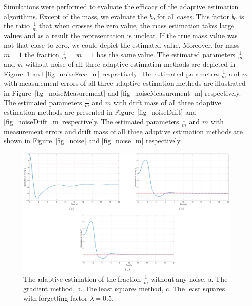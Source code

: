 \documentclass[12pt]{article}
\newenvironment{question}[2][Question]{\begin{trivlist}
\item[\hskip \labelsep {\bfseries #1}\hskip \labelsep {\bfseries #2.}]}{\end{trivlist}}
\begin{document}
\begin{question}{2} %
\end{question}
Simulations were performed to evaluate the efficacy of the adaptive estimation algorithms. Except of the mass, we evaluate the $b_0$ for all cases. This factor $b_0$ is the ratio $\frac{1}{m}$ that when crosses the zero value, the mass estimation takes large values and as a result the representation is unclear. If the true mass value was not that close to zero, we could depict the estimated value. Moreover, for mass $m=1$ the fraction $\frac{1}{m}=m=1$ has the same value. The estimated parameters $\frac{1}{m}$ and $m$ without noise of all three adaptive estimation methods are depicted in Figure~\ref{fig_noiseFree} and \ref{fig_noiseFree_m} respectively. The estimated parameters $\frac{1}{m}$ and $m$ with measurement errors of all three adaptive estimation methods are illustrated in Figure~\ref{fig_noiseMeasurement} and \ref{fig_noiseMeasurement_m} respectively. The estimated parameters $\frac{1}{m}$ and $m$ with drift mass of all three adaptive estimation methods are presented in Figure~\ref{fig_noiseDrift} and \ref{fig_noiseDrift_m} respectively. The estimated parameters $\frac{1}{m}$ and $m$ with measurement errors and drift mass of all three adaptive estimation methods are shown in Figure~\ref{fig_noise} and \ref{fig_noise_m} respectively. 

\begin{figure}[!h]
	\includegraphics[width=.95\columnwidth]{figures/noiseFree.png}
	\centering
	\caption{The adaptive estimation of the fraction $\frac{1}{m}$ without any noise, a. The gradient method, b. The least squares method, c. The least squares with forgetting factor $\lambda=0.5$.}
	\label{fig_noiseFree}
\end{figure}
\end{document}
